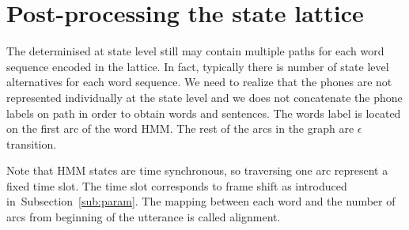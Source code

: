 % 
% 

\section{Post-processing the state lattice}
\label{sec:postprocess}
The  determinised at state level still may contain
multiple paths for each word sequence encoded in the lattice.
In fact, typically there is number of state level alternatives for each word sequence.
We need to realize that the phones are not represented individually at the state level
and we does not concatenate the phone labels on path in order to obtain words and sentences.
The words label is located on the first arc of the word \ac{HMM}. 
The rest of the arcs in the graph are $\epsilon$ transition.

Note that \ac{HMM} states are time synchronous, so traversing one arc represent a fixed time slot.
The time slot corresponds to frame shift as introduced in~Subsection~\ref{sub:param}.
The mapping between each word and the number of arcs from beginning of the utterance is called
alignment.


